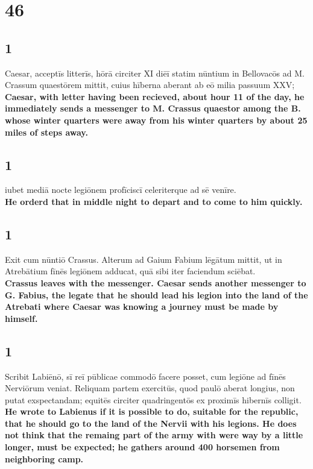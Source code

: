\documentclass{article}
\begin{document}
\section*{46}

\subsection*{1}
Caesar, acceptīs litterīs, hōrā circiter XI diēī statim nūntium in Bellovacōs ad M. Crassum quaestōrem mittit, cuius hīberna aberant ab eō milia passuum XXV;\\
\textbf{Caesar, with letter having been recieved, about hour 11 of the day, he immediately sends a messenger to M. Crassus quaestor among the B. whose winter quarters were away from his winter quarters by about 25 miles of steps away.}

\subsection*{1}
iubet mediā nocte legiōnem profīciscī celeriterque ad sē venīre.\\
\textbf{He orderd that in middle night to depart and to come to him quickly.}

\subsection*{1}
Exit cum nūntiō Crassus. Alterum ad Gaium Fabium lēgātum mittit, ut in Atrebātium fīnēs legiōnem adducat, quā sibi iter faciendum sciēbat. \\
\textbf{Crassus leaves with the messenger. Caesar sends another messenger to G. Fabius, the legate that he should lead his legion into the land of the Atrebati where Caesar was knowing a journey must be made by himself.}

\subsection*{1}
Scribit Labiēnō, sī reī pūblicae commodō facere posset, cum legiōne ad fīnēs Nerviōrum veniat. Reliquam partem exercitūs, quod paulō aberat longius, non putat exspectandam; equitēs circiter quadringentōs ex proximīs hibernīs colligit.\\
\textbf{He wrote to Labienus if it is possible to do, suitable for the republic, that he should go to the land of the Nervii with his legions. He does not think that the remaing part of the army with were way by a little longer, must be expected; he gathers around 400 horsemen from neighboring camp.}
\end{document}
